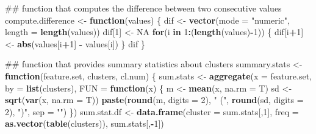 \documentclass[]{article}
\newenvironment{Shaded}{\begin{snugshade}}{\end{snugshade}}
\newcommand{\KeywordTok}[1]{\textcolor[rgb]{0.13,0.29,0.53}{\textbf{#1}}}
\newcommand{\DataTypeTok}[1]{\textcolor[rgb]{0.13,0.29,0.53}{#1}}
\newcommand{\DecValTok}[1]{\textcolor[rgb]{0.00,0.00,0.81}{#1}}
\newcommand{\StringTok}[1]{\textcolor[rgb]{0.31,0.60,0.02}{#1}}
\newcommand{\OtherTok}[1]{\textcolor[rgb]{0.56,0.35,0.01}{#1}}
\newcommand{\ControlFlowTok}[1]{\textcolor[rgb]{0.13,0.29,0.53}{\textbf{#1}}}
\newcommand{\OperatorTok}[1]{\textcolor[rgb]{0.81,0.36,0.00}{\textbf{#1}}}
\newcommand{\NormalTok}[1]{#1}
\begin{document}
\begin{Shaded}
\begin{Highlighting}[]
\NormalTok{## function that computes the difference between two consecutive values}
\NormalTok{compute.difference <-}\StringTok{ }\ControlFlowTok{function}\NormalTok{(values) \{}
\NormalTok{  dif <-}\StringTok{ }\KeywordTok{vector}\NormalTok{(}\DataTypeTok{mode =} \StringTok{"numeric"}\NormalTok{, }\DataTypeTok{length =} \KeywordTok{length}\NormalTok{(values))}
\NormalTok{  dif[}\DecValTok{1}\NormalTok{] <-}\StringTok{ }\OtherTok{NA}
  \ControlFlowTok{for}\NormalTok{(i }\ControlFlowTok{in} \DecValTok{1}\OperatorTok{:}\NormalTok{(}\KeywordTok{length}\NormalTok{(values)}\OperatorTok{-}\DecValTok{1}\NormalTok{)) \{}
\NormalTok{    dif[i}\OperatorTok{+}\DecValTok{1}\NormalTok{] <-}\StringTok{ }\KeywordTok{abs}\NormalTok{(values[i}\OperatorTok{+}\DecValTok{1}\NormalTok{] }\OperatorTok{-}\StringTok{ }\NormalTok{values[i])}
\NormalTok{  \}}
\NormalTok{  dif}
\NormalTok{\}}

\NormalTok{## function that provides summary statistics about clusters}
\NormalTok{summary.stats <-}\StringTok{ }\ControlFlowTok{function}\NormalTok{(feature.set, clusters, cl.num) \{}
\NormalTok{  sum.stats <-}\StringTok{ }\KeywordTok{aggregate}\NormalTok{(}\DataTypeTok{x =}\NormalTok{ feature.set, }
                         \DataTypeTok{by =} \KeywordTok{list}\NormalTok{(clusters), }
                         \DataTypeTok{FUN =} \ControlFlowTok{function}\NormalTok{(x) \{ }
\NormalTok{                           m <-}\StringTok{ }\KeywordTok{mean}\NormalTok{(x, }\DataTypeTok{na.rm =}\NormalTok{ T)}
\NormalTok{                           sd <-}\StringTok{ }\KeywordTok{sqrt}\NormalTok{(}\KeywordTok{var}\NormalTok{(x, }\DataTypeTok{na.rm =}\NormalTok{ T))}
                           \KeywordTok{paste}\NormalTok{(}\KeywordTok{round}\NormalTok{(m, }\DataTypeTok{digits =} \DecValTok{2}\NormalTok{), }\StringTok{" ("}\NormalTok{, }
                                 \KeywordTok{round}\NormalTok{(sd, }\DataTypeTok{digits =} \DecValTok{2}\NormalTok{), }\StringTok{")"}\NormalTok{, }\DataTypeTok{sep =} \StringTok{""}\NormalTok{)}
\NormalTok{                         \})}
\NormalTok{  sum.stat.df <-}\StringTok{ }\KeywordTok{data.frame}\NormalTok{(}\DataTypeTok{cluster =}\NormalTok{ sum.stats[,}\DecValTok{1}\NormalTok{], }
                            \DataTypeTok{freq =} \KeywordTok{as.vector}\NormalTok{(}\KeywordTok{table}\NormalTok{(clusters)),}
\NormalTok{                            sum.stats[,}\OperatorTok{-}\DecValTok{1}\NormalTok{])}
  

\end{Highlighting}
\end{Shaded}
\end{document}
